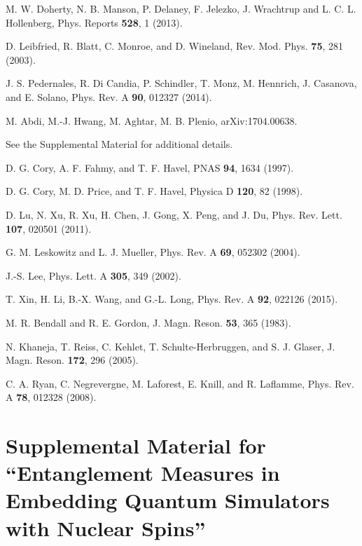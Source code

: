 \documentclass[10pt,nofootinbib,notitlepage,twocolumn,superscriptaddress]{revtex4-1}
\theoremstyle{plain}
\theoremstyle{definition}
\begin{document}
\begin{thebibliography}{99}
 M. W. Doherty, N. B. Manson, P. Delaney, F. Jelezko, J. Wrachtrup and L. C. L. Hollenberg, Phys. Reports {\bf 528}, 1 (2013).

 D. Leibfried, R. Blatt, C. Monroe, and D. Wineland, Rev. Mod. Phys. {\bf 75}, 281 (2003).

 J. S. Pedernales, R. Di Candia, P. Schindler, T. Monz, M. Hennrich, J. Casanova, and E. Solano, Phys. Rev. A {\bf 90}, 012327 (2014).

 M. Abdi, M.-J. Hwang, M. Aghtar, M. B. Plenio, arXiv:1704.00638.

 See the Supplemental Material for additional details.

 D. G. Cory, A. F. Fahmy, and T. F. Havel, PNAS  {\bf 94}, 1634 (1997).

 D. G. Cory, M. D. Price, and T. F. Havel, Physica D  {\bf 120}, 82 (1998).

 D. Lu, N. Xu, R. Xu, H. Chen, J. Gong, X. Peng, and J. Du, Phys. Rev. Lett. {\bf 107}, 020501 (2011).

 G. M. Leskowitz and L. J. Mueller, Phys. Rev. A  {\bf 69}, 052302 (2004).

 J.-S. Lee, Phys. Lett. A  {\bf 305}, 349 (2002).

 T. Xin, H. Li, B.-X. Wang, and G.-L. Long, Phys. Rev. A {\bf 92}, 022126 (2015).

 M. R. Bendall and R. E. Gordon, J. Magn. Reson.  {\bf 53}, 365 (1983).

 N. Khaneja, T. Reiss, C. Kehlet, T. Schulte-Herbruggen, and S. J. Glaser, J. Magn. Reson. {\bf 172}, 296 (2005).

 C. A. Ryan, C. Negrevergne, M. Laforest, E. Knill, and R. Laflamme, Phys. Rev. A {\bf 78}, 012328 (2008).

\end{thebibliography}

\clearpage

\onecolumngrid


\section*{Supplemental Material for \\ ``Entanglement Measures in Embedding Quantum Simulators with Nuclear Spins''}
\end{document}
